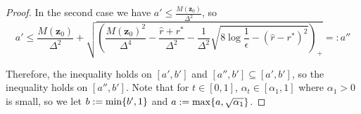 \documentclass[10pt,a4paper]{amsart}
\DeclarePairedDelimiter{\set}{\lbrace}{\rbrace}
\newcommand{\fitparenth}[1]{\left(#1\right)}
\newcommand{\separation}{\Delta}
\newcommand{\vect}[1]{\mathbf{#1}}
\begin{document}
\begin{proof}
    In the second case we have $a'\leq \frac{M(\vect z_0)}{\separation^2}$, so
    \[a'\leq \frac{M(\vect z_0)}{\separation^2} +\sqrt{\fitparenth{\frac{M(\vect z_0)^2}{\separation^4}-\frac{\hat r+r^*}{\separation^2}-\frac{1}{\separation^2}\sqrt{8\log \frac{1}{\epsilon}-(\hat r-r^*)^2}}_+}=:a'' \]
    
    Therefore, the inequality holds on $[a',b']$ and $[a'',b']\subseteq [a',b']$, so the inequality holds on $[a'',b']$. Note that for $t\in [0,1]$, $\alpha_t\in [\alpha_1, 1]$ where $\alpha_1 >0$ is small, so we let $b:= \min\set{b', 1}$ and $a:=\max\set{a,\sqrt{\alpha_1}}$.
\end{proof}
\end{document}
